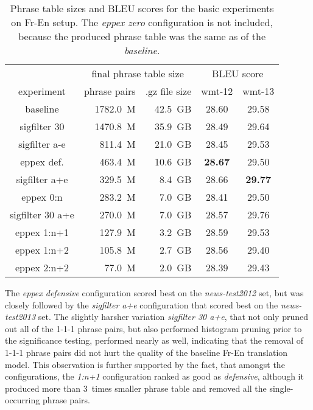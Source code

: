 \begin{table}[ht]
\centering
\begin{tabular}{ | c | r r | c c | }
\hline
 & \multicolumn{2}{|c|}{final phrase table size} & \multicolumn{2}{|c|}{BLEU score} \\
experiment & phrase pairs & .gz file size & wmt-12 & wmt-13 \\
\hline
\hline
baseline          & 1782.0~M & 42.5~GB & 28.60 & 29.58 \\
sigfilter 30      & 1470.8~M & 35.9~GB & 28.49 & 29.64 \\
sigfilter a-e     &  811.4~M & 21.0~GB & 28.45 & 29.53 \\
eppex def.        &  463.4~M & 10.6~GB & \textbf{28.67} & 29.50 \\
sigfilter a+e     &  329.5~M &  8.4~GB & 28.66 & \textbf{29.77} \\
eppex 0:n         &  283.2~M &  7.0~GB & 28.41 & 29.50 \\
sigfilter 30 a+e  &  270.0~M &  7.0~GB & 28.57 & 29.76 \\
eppex 1:n+1       &  127.9~M &  3.2~GB & 28.59 & 29.53 \\
eppex 1:n+2       &  105.8~M &  2.7~GB & 28.56 & 29.40 \\
eppex 2:n+2       &   77.0~M &  2.0~GB & 28.39 & 29.43 \\
\hline
\end{tabular}
\caption{\label{fr-en-pt-size-and-bleu}
Phrase table sizes and BLEU scores for the basic experiments on Fr-En setup.
The \emph{eppex zero} configuration is not included, because the produced phrase table
was the same as of the \emph{baseline}.
}
\end{table}

The \emph{eppex defensive} configuration scored best on the \emph{news-test2012} set,
but was closely followed by the \emph{sigfilter a+e} configuration that scored best on
the \emph{news-test2013} set.
The slightly harsher variation \emph{sigfilter 30 a+e}, that not only pruned out
all of the 1-1-1 phrase pairs, but also performed histogram pruning prior to
the significance testing, performed nearly as well, indicating that the removal of
1-1-1 phrase pairs did not hurt the quality of the baseline Fr-En translation model.
This observation is further supported by the fact, that amongst the \eppex{} configurations,
the \emph{1:n+1} configuration ranked as good as \emph{defensive}, although it produced more
than 3~times smaller phrase table and removed all the single-occurring phrase pairs.

